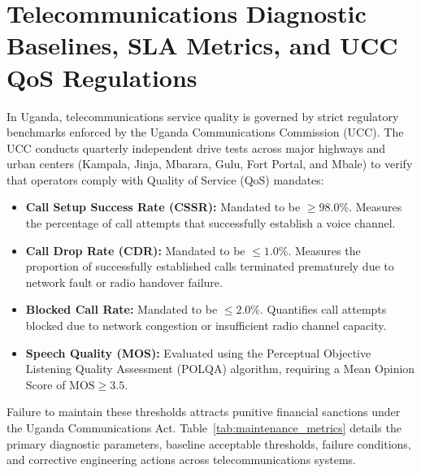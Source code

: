 \documentclass[12pt,a4paper]{report}
\begin{document}
\section{Telecommunications Diagnostic Baselines, SLA Metrics, and UCC QoS Regulations}
In Uganda, telecommunications service quality is governed by strict regulatory benchmarks enforced by the Uganda Communications Commission (UCC). The UCC conducts quarterly independent drive tests across major highways and urban centers (Kampala, Jinja, Mbarara, Gulu, Fort Portal, and Mbale) to verify that operators comply with Quality of Service (QoS) mandates:
\begin{itemize}
    \item \textbf{Call Setup Success Rate (CSSR):} Mandated to be $\ge 98.0\%$. Measures the percentage of call attempts that successfully establish a voice channel.
    \item \textbf{Call Drop Rate (CDR):} Mandated to be $\le 1.0\%$. Measures the proportion of successfully established calls terminated prematurely due to network fault or radio handover failure.
    \item \textbf{Blocked Call Rate:} Mandated to be $\le 2.0\%$. Quantifies call attempts blocked due to network congestion or insufficient radio channel capacity.
    \item \textbf{Speech Quality (MOS):} Evaluated using the Perceptual Objective Listening Quality Assessment (POLQA) algorithm, requiring a Mean Opinion Score of $\text{MOS} \ge 3.5$.
\end{itemize}

Failure to maintain these thresholds attracts punitive financial sanctions under the Uganda Communications Act. Table~\ref{tab:maintenance_metrics} details the primary diagnostic parameters, baseline acceptable thresholds, failure conditions, and corrective engineering actions across telecommunications systems.
\end{document}
